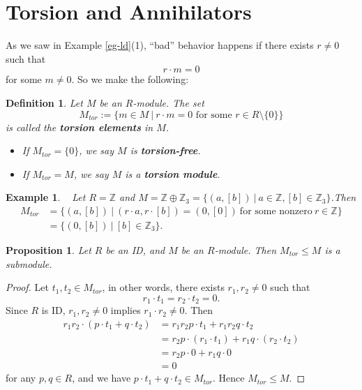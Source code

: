 \documentclass[12pt]{amsbook}
\newtheorem{definition}[theorem]{Definition}
\newtheorem{example}[theorem]{Example}
\newtheorem{proposition}[theorem]{Proposition}
\begin{document}
\section{Torsion and Annihilators}
As we saw in Example \ref{eg-ld}(1), ``bad'' behavior happens if there exists $r\neq0$ such that $$r\cdot m=0$$
for some $m\neq0$. So we make the following:
\begin{definition}
    Let $M$ be an $R$-module. The set 
    $$M_{tor}:=\{m\in M\ |\ r\cdot m=0 \text{ for some }r\in R\setminus\{0\}\}$$
    is called the {\bf torsion elements} in $M$.
    \begin{itemize}
        \item If $M_{tor}=\{0\}$, we say $M$ is {\bf torsion-free}.
        \item If $M_{tor}=M$, we say $M$ is a {\bf torsion module}.
    \end{itemize}
\end{definition}

\begin{example} \label{eg-torsionelements}\
     Let $R=\mathbb{Z}$ and $M=\mathbb{Z}\oplus\mathbb{Z}_{3}=\{(a,[b])\ |\ a\in\mathbb{Z},[b]\in\mathbb{Z}_{3}\}$.Then
        \begin{align*}
            M_{tor}&=\{(a,[b])\ |\ (r\cdot a,r \cdot[b])=(0,[0])\ \text{for some nonzero}\ r \in \mathbb{Z}\}\\
            &=\{(0,[b])\ |\ [b]\in\mathbb{Z}_{3}\}.
        \end{align*}
\end{example}

\begin{proposition} \label{torsionsubmodule}
    Let $R$ be an ID, and $M$ be an $R$-module. Then $M_{tor} \leq M$ is a submodule.
\end{proposition}

\begin{proof}
    Let $t_1,t_2\in M_{tor}$, in other words, there exists $r_1,r_2\neq0$ such that 
    $$r_1\cdot t_1=r_2\cdot t_2=0.$$
    Since $R$ is ID, $r_1,r_2\neq0$ implies $r_1\cdot r_2\neq0$. Then
    \begin{align*}
        r_1r_2\cdot(p\cdot t_1+q\cdot t_2)&=r_1r_2p\cdot t_1+r_1r_2q\cdot t_2\\
        &=r_2p\cdot(r_1\cdot t_1)+r_1q\cdot(r_2\cdot t_2)\\
        &=r_2p\cdot0+r_1q\cdot0\\
        &=0
    \end{align*}
    for any $p,q\in R$, and we have $p\cdot t_1+q\cdot t_2\in M_{tor}$. Hence $M_{tor} \leq M$.
\end{proof}
\end{document}
